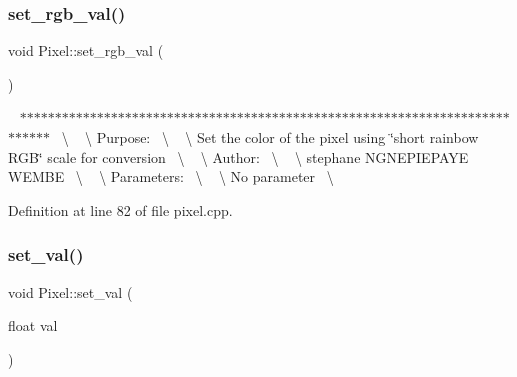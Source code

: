 \subsubsection{\texorpdfstring{set\+\_\+rgb\+\_\+val()}{set\_rgb\_val()}}
{\footnotesize\ttfamily void Pixel\+::set\+\_\+rgb\+\_\+val (\begin{DoxyParamCaption}{ }\end{DoxyParamCaption})}

~\newline
$\ast$$\ast$$\ast$$\ast$$\ast$$\ast$$\ast$$\ast$$\ast$$\ast$$\ast$$\ast$$\ast$$\ast$$\ast$$\ast$$\ast$$\ast$$\ast$$\ast$$\ast$$\ast$$\ast$$\ast$$\ast$$\ast$$\ast$$\ast$$\ast$$\ast$$\ast$$\ast$$\ast$$\ast$$\ast$$\ast$$\ast$$\ast$$\ast$$\ast$$\ast$$\ast$$\ast$$\ast$$\ast$$\ast$$\ast$$\ast$$\ast$$\ast$$\ast$$\ast$$\ast$$\ast$$\ast$$\ast$$\ast$$\ast$$\ast$$\ast$$\ast$$\ast$$\ast$$\ast$$\ast$$\ast$$\ast$$\ast$$\ast$$\ast$$\ast$$\ast$$\ast$$\ast$$\ast$$\ast$~\newline
\textbackslash{} ~\newline
\textbackslash{} Purpose\+:~\newline
\textbackslash{} ~\newline
\textbackslash{} Set the color of the pixel using \char`\"{}short rainbow R\+G\+B\char`\"{} scale for conversion~\newline
\textbackslash{} ~\newline
\textbackslash{} Author\+:~\newline
\textbackslash{} ~\newline
\textbackslash{} stephane N\+G\+N\+E\+P\+I\+E\+P\+A\+YE W\+E\+M\+BE~\newline
\textbackslash{} ~\newline
\textbackslash{} Parameters\+:~\newline
\textbackslash{} ~\newline
\textbackslash{} No parameter~\newline
\textbackslash{} ~\newline


Definition at line 82 of file pixel.\+cpp.

\mbox{\label{class_pixel_a0064982203ecaf79cf79ecfa04fb4f1f}} 
\subsubsection{\texorpdfstring{set\+\_\+val()}{set\_val()}}
{\footnotesize\ttfamily void Pixel\+::set\+\_\+val (\begin{DoxyParamCaption}\item[{float}]{val }\end{DoxyParamCaption})}

